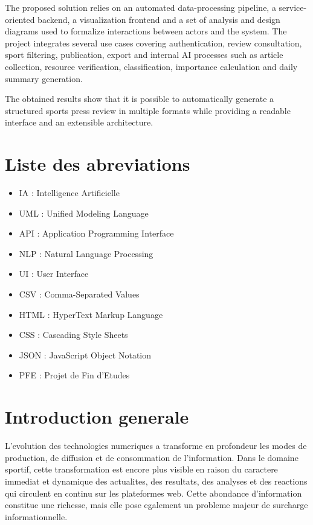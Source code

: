 \documentclass[12pt,a4paper,oneside]{report}
\begin{document}
The proposed solution relies on an automated data-processing pipeline, a service-oriented backend, a visualization frontend and a set of analysis and design diagrams used to formalize interactions between actors and the system. The project integrates several use cases covering authentication, review consultation, sport filtering, publication, export and internal AI processes such as article collection, resource verification, classification, importance calculation and daily summary generation.

The obtained results show that it is possible to automatically generate a structured sports press review in multiple formats while providing a readable interface and an extensible architecture.

\tableofcontents
\listoffigures
\listoftables

\chapter*{Liste des abreviations}
\begin{itemize}[leftmargin=2cm]
\item IA : Intelligence Artificielle
\item UML : Unified Modeling Language
\item API : Application Programming Interface
\item NLP : Natural Language Processing
\item UI : User Interface
\item CSV : Comma-Separated Values
\item HTML : HyperText Markup Language
\item CSS : Cascading Style Sheets
\item JSON : JavaScript Object Notation
\item PFE : Projet de Fin d'Etudes
\end{itemize}

\chapter*{Introduction generale}
L'evolution des technologies numeriques a transforme en profondeur les modes de production, de diffusion et de consommation de l'information. Dans le domaine sportif, cette transformation est encore plus visible en raison du caractere immediat et dynamique des actualites, des resultats, des analyses et des reactions qui circulent en continu sur les plateformes web. Cette abondance d'information constitue une richesse, mais elle pose egalement un probleme majeur de surcharge informationnelle.
\end{document}
